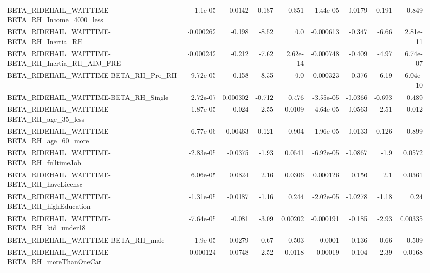 \begin{tabular}{lrrrrrrrr}
BETA\_RIDEHAIL\_WAITTIME-BETA\_RH\_Income\_4000\_less    &    -1.1e-05 &      -0.0142 &   -0.187 &    0.851 &   1.44e-05 &      0.0179 &       -0.191 &         0.849 \\
BETA\_RIDEHAIL\_WAITTIME-BETA\_RH\_Inertia\_RH          &   -0.000262 &       -0.198 &    -8.52 &      0.0 &  -0.000613 &      -0.347 &        -6.66 &      2.81e-11 \\
BETA\_RIDEHAIL\_WAITTIME-BETA\_RH\_Inertia\_RH\_ADJ\_FRE  &   -0.000242 &       -0.212 &    -7.62 & 2.62e-14 &  -0.000748 &      -0.409 &        -4.97 &      6.74e-07 \\
BETA\_RIDEHAIL\_WAITTIME-BETA\_RH\_Pro\_RH              &   -9.72e-05 &       -0.158 &    -8.35 &      0.0 &  -0.000323 &      -0.376 &        -6.19 &      6.04e-10 \\
BETA\_RIDEHAIL\_WAITTIME-BETA\_RH\_Single              &    2.72e-07 &     0.000302 &   -0.712 &    0.476 &  -3.55e-05 &     -0.0366 &       -0.693 &         0.489 \\
BETA\_RIDEHAIL\_WAITTIME-BETA\_RH\_age\_35\_less         &   -1.87e-05 &       -0.024 &    -2.55 &   0.0109 &  -4.64e-05 &     -0.0563 &        -2.51 &         0.012 \\
BETA\_RIDEHAIL\_WAITTIME-BETA\_RH\_age\_60\_more         &   -6.77e-06 &     -0.00463 &   -0.121 &    0.904 &   1.96e-05 &      0.0133 &       -0.126 &         0.899 \\
BETA\_RIDEHAIL\_WAITTIME-BETA\_RH\_fulltimeJob         &   -2.83e-05 &      -0.0375 &    -1.93 &   0.0541 &  -6.92e-05 &     -0.0867 &         -1.9 &        0.0572 \\
BETA\_RIDEHAIL\_WAITTIME-BETA\_RH\_haveLicense         &    6.06e-05 &       0.0824 &     2.16 &   0.0306 &   0.000126 &       0.156 &          2.1 &        0.0361 \\
BETA\_RIDEHAIL\_WAITTIME-BETA\_RH\_highEducation       &   -1.31e-05 &      -0.0187 &    -1.16 &    0.244 &  -2.02e-05 &     -0.0278 &        -1.18 &          0.24 \\
BETA\_RIDEHAIL\_WAITTIME-BETA\_RH\_kid\_under18         &   -7.64e-05 &       -0.081 &    -3.09 &  0.00202 &  -0.000191 &      -0.185 &        -2.93 &       0.00335 \\
BETA\_RIDEHAIL\_WAITTIME-BETA\_RH\_male                &     1.9e-05 &       0.0279 &     0.67 &    0.503 &     0.0001 &       0.136 &         0.66 &         0.509 \\
BETA\_RIDEHAIL\_WAITTIME-BETA\_RH\_moreThanOneCar      &   -0.000124 &      -0.0748 &    -2.52 &   0.0118 &   -0.00019 &      -0.104 &        -2.39 &        0.0168 \\

\end{tabular}
